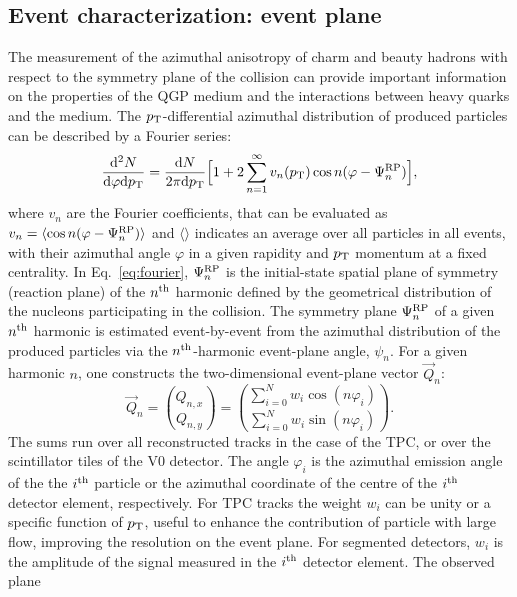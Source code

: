 \subsection{Event characterization: event plane}
\label{sec:EventPlane}
The measurement of the azimuthal anisotropy of charm and beauty hadrons
with respect to the symmetry plane of the collision can provide important information on the properties of the QGP medium 
and the interactions between heavy quarks and the medium.
The $p_{\rm T}$-differential azimuthal distribution of produced particles can be described by a Fourier series:
\begin{equation}
\label{eq:fourier}
\frac{{\rm d}^2N}{{\rm d} \varphi {\rm d}p_{\rm T}} =  \frac{{\rm d}N}{2\pi {\rm d}p_{\rm T}} \Big [ 1+ 2 \sum_{n=1}^{\infty} v_n(p_{\rm T}) \,{\rm cos} \,n(\varphi- \Psi_n^{\rm RP})\Big ], 
\end{equation}
where $v_n$ are the Fourier coefficients, that can be evaluated as 
$v_n = \langle {\rm cos} \, n(\varphi - \Psi_n^{\rm RP})\rangle$ and $\langle \rangle$ indicates an average over 
 all particles in all events, with their azimuthal angle $\varphi$ in a given rapidity and $p_{\rm T}$ 
 momentum at a fixed centrality. In Eq.~\ref{eq:fourier},
$\Psi_n^{\rm RP}$ is the initial-state spatial plane of symmetry (reaction plane) of
 the $n^{\rm th}$ harmonic defined by the geometrical distribution of the nucleons participating in the collision.
The symmetry plane $\Psi_n^{\rm RP}$ of a given $n^{\rm th}$ harmonic is estimated 
 event-by-event from the azimuthal distribution of the produced particles
via the $n^{\rm th}$-harmonic event-plane angle, $\psi_n$.
For a given harmonic $n$, one constructs the two-dimensional event-plane 
vector $\vec{Q}_n$:
\begin{equation}
\label{eq:qvector}
 \vec{Q}_n= {Q_{n,x} \choose Q_{n,y}} = {\sum_{i=0}^{N} w_i \cos (n\varphi_i) \choose \sum_{i=0}^{N} w_i \sin (n\varphi_i)}.
\end{equation}
The sums run over all reconstructed tracks in the case 
of the TPC, or over the scintillator tiles of the V0 detector.
The angle $\varphi_i$ is the azimuthal emission angle of the the $i^{\rm th}$ particle or the 
azimuthal coordinate of the centre of the $i^{\rm th}$ detector element, respectively. 
For TPC tracks the weight $w_i$ can be unity or a specific 
function of $p_{\rm T}$, useful to enhance the 
contribution of particle with large flow, improving 
the resolution on the event plane. For segmented detectors, $w_i$ is the amplitude of the 
signal measured in the $i^{\rm th}$ detector element. The observed plane 
